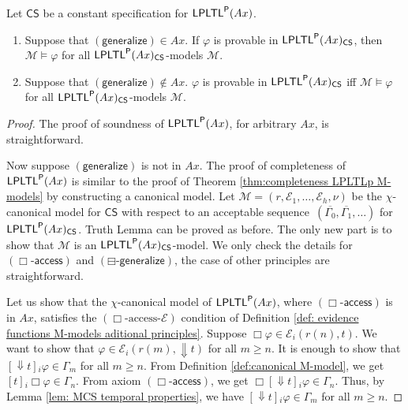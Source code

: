 \documentclass[envcountsect,envcountsame,oribibl,orivec]{llncs}
\newcommand{\lalways}{\Box}
\newcommand{\lsofar}{\boxminus}
\newcommand{\LPLTLp}{\textsf{LPLTL}^{\sf P}}
\newcommand{\jbox}[1]{\left[#1\right]\!}
\newcommand{\talwaysaccess}{\Downarrow}
\newcommand{\CS}{\textsf{CS}}
\newcommand{\numberofagents}{h}
\newcommand{\agent}{i}
\newcommand{\alwaysaccessprinciple}{\ensuremath{(\lalways\textsf{-access})}}
\newcommand{\generalizeprinciple}{\ensuremath{(\textsf{generalize})}}
\newcommand{\pastgeneralizeprinciple}{\ensuremath{(\lsofar\textsf{-generalize})}}
\newcommand{\alwaysaccessevidence}{\ensuremath{(\lalways\text{-access-}\evidence)}}
\newcommand{\evidence}{\mathcal{E}}
\newcommand{\valuation}{\nu}
\newcommand{\entails}{\vDash}
\newcommand{\M}{\mathcal{M}}
\renewcommand{\phi}{\varphi}
\begin{document}
\begin{theorem}\label{thm:completeness M-models additional principles}
	Let  $\CS$ be a constant specification for $\LPLTLp(Ax)$. 
	\begin{enumerate}
		\item Suppose that $\generalizeprinciple \in Ax$. If $\phi$  is provable in $\LPLTLp(Ax)_\CS$, then $\M\entails \phi$ for all $\LPLTLp(Ax)_\CS$-models $\M$.
		
		\item Suppose that $\generalizeprinciple \not \in Ax$. $\phi$  is provable in $\LPLTLp(Ax)_\CS$ iff $\M\entails \phi$ for all $\LPLTLp(Ax)_\CS$-models $\M$.
	\end{enumerate}
	
\end{theorem}
\begin{proof}
The proof of soundness of $\LPLTLp(Ax)$, for arbitrary $Ax$, is straightforward. 

Now suppose $\generalizeprinciple$ is not in $Ax$. The proof of completeness of $\LPLTLp(Ax)$ is similar to the proof of Theorem \ref{thm:completeness LPLTLp M-models} by constructing a canonical model. Let $\M = (r,\evidence_1,\ldots,\evidence_\numberofagents, \valuation)$ be the $\chi$-canonical  model for $\CS$
with respect to an acceptable sequence~$(\overline{\Gamma_0}, \overline{\Gamma_1}, \ldots)$ for $\LPLTLp(Ax)_\CS$.	  Truth Lemma can be proved as before. The only new part is to show that $\M$  is an $\LPLTLp(Ax)_\CS$-model.  We only check the details for $\alwaysaccessprinciple$ and $\pastgeneralizeprinciple$, the case of other principles are straightforward.

Let us show that the $\chi$-canonical model of  $\LPLTLp(Ax)$, where $\alwaysaccessprinciple$ is in $Ax$, satisfies the $\alwaysaccessevidence$ condition of Definition \ref{def: evidence functions M-models aditional principles}. Suppose $\lalways \phi \in \evidence_\agent(r(n), t)$. We want to show that $\phi \in \evidence_i(r(m), \talwaysaccess t)$ for all $m \geq n$. It is enough to show that $ \jbox{\talwaysaccess t}_i \phi \in \Gamma_m$ for all $m \geq n$. From Definition \ref{def:canonical M-model}, we get $\jbox{t}_i \lalways \phi \in \Gamma_n$. From axiom $\alwaysaccessprinciple$, we get $ \lalways \jbox{\talwaysaccess t}_i \phi \in \Gamma_n$. Thus, by Lemma \ref{lem: MCS temporal properties}, we have $ \jbox{\talwaysaccess t}_i \phi \in \Gamma_m$ for all $m \geq n$.



\end{proof}
\end{document}
